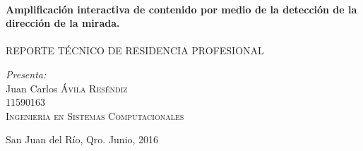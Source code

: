 \documentclass[12pt]{book} %
\begin{document}
\begin{titlepage}

\HRule \\[0.4cm]
{ \huge \bfseries Amplificación interactiva de contenido por medio de la detección de la dirección de la mirada.}\\[0.4cm] %
\HRule \\[1.5cm]

\textsc{\Large REPORTE TÉCNICO DE RESIDENCIA PROFESIONAL}\\[3cm] %
\begin{center}

	\emph{\Large Presenta:}\\
	\Large Juan Carlos \textsc{\'Avila Reséndiz}\\[0.1cm] %
	\Large \textsc{11590163}\\[0.1cm]
	\Large \textsc{Ingeniería en Sistemas Computacionales}\\[3cm]

	
\end{center}





\hspace{5cm} \Large San Juan del Río, Qro. Junio, 2016\\[0.5cm] %


\end{titlepage}
\end{document}
